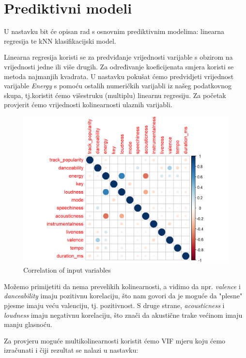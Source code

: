 \section{Prediktivni modeli}

	U nastavku bit će opisan rad s osnovnim prediktivnim modelima: linearna regresija te kNN klasifikacijski model. 
	
	Linearna regresija koristi se za predviđanje vrijednosti varijable s obzirom na vrijednosti jedne ili više drugih. Za određivanje koeficijenata smjera koristi se metoda najmanjih kvadrata. U nastavku pokušat ćemo predvidjeti vrijednost varijable \textit{Energy} s pomoću ostalih numeričkih varijabli iz našeg podatkovnog skupa, tj.koristit ćemo višestruku (multiplu) linearnu regresiju.
	Za početak provjerit ćemo vrijednosti kolinearnosti ulaznih varijabli.
	
	\begin{figure}[H]
		\includegraphics[scale=0.9]{slike/corrplot.png}
		\centering
		\caption{Correlation of input variables}
		
	\end{figure}
	
	Možemo primijetiti da nema prevelikih kolinearnosti, a vidimo da npr. \textit{valence} i \textit{danceability} imaju  pozitivnu korelaciju, što nam govori da je moguće da "plesne" pjesme imaju veću valenciju, tj. pozitivnost.
	S druge strane, \textit{acousticness} i \textit{loudness} imaju negativnu korelaciju, što znači da akustične trake većinom imaju manju glasnoću.
	
	Za provjeru moguće multikolinearnosti koristit ćemo VIF mjeru koju ćemo izračunati i čiji rezultat se nalazi u nastavku:
	
